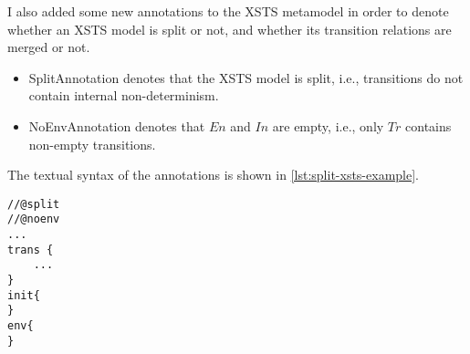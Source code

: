 I also added some new annotations to the XSTS metamodel in order to denote whether an XSTS model is split or not, and whether its transition relations are merged or not.
\begin{itemize}
    \item \textsf{SplitAnnotation} denotes that the XSTS model is split, i.e., transitions do not contain internal non-determinism.
    \item \textsf{NoEnvAnnotation} denotes that $En$ and $In$ are empty, i.e., only $Tr$ contains non-empty transitions.
\end{itemize}

The textual syntax of the annotations is shown in \autoref{lst:split-xsts-example}.

\begin{lstlisting}[float={htbp},language=xsts,caption={Example split XSTS model with annotations.},label={lst:split-xsts-example},linewidth=\textwidth]
//@split
//@noenv
...
trans {
    ...
}
init{
}
env{
}
\end{lstlisting}
